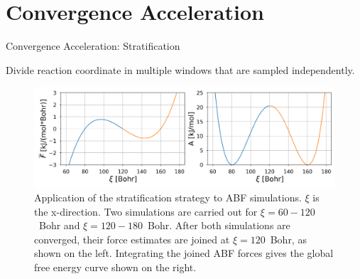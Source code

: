 \documentclass[10pt]{beamer}
\begin{document}
\section{Convergence Acceleration}
\begin{frame}{Convergence Acceleration: Stratification}
\begin{tcolorbox}[colback=green!5,colframe=green!40!black, title=Concept]
  Divide reaction coordinate in multiple windows that are sampled independently.
\end{tcolorbox}
\begin{figure}[H]
    \centering
    \includegraphics[width=1\textwidth]{bilder/ABF_stratification}
    \caption{Application of the stratification strategy to ABF simulations. $\xi$ is the x-direction. Two simulations are carried out for $\xi=60-120$~Bohr and $\xi=120-180$~Bohr. After both simulations are converged, their force estimates are joined at $\xi=120$~Bohr, as shown on the left. Integrating the joined ABF forces gives the global free energy curve shown on the right. }
\end{figure}
\end{frame}
\end{document}
